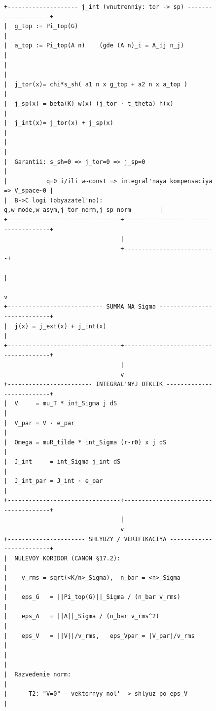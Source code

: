\begin{figure}[p]
{\begin{minipage}{0.97\textwidth}
\begin{Verbatim}[fontsize=\footnotesize]
+-------------------- j_int (vnutrenniy: tor -> sp) --------------------+
|  g_top := Pi_top(G)                                                   |
|  a_top := Pi_top(A n)    (gde (A n)_i = A_ij n_j)                     |
|                                                                        |
|  j_tor(x)= chi*s_sh( a1 n x g_top + a2 n x a_top )                     |
|  j_sp(x) = beta(K) w(x) (j_tor · t_theta) h(x)                         |
|  j_int(x)= j_tor(x) + j_sp(x)                                          |
|                                                                        |
|  Garantii: s_sh=0 => j_tor=0 => j_sp=0                                 |
|           q=0 i/ili w~const => integral'naya kompensaciya => V_space~0 |
|  B->C logi (obyazatel'no): q,w_mode,w_asym,j_tor_norm,j_sp_norm        |
+--------------------------------+--------------------------------------+
                                 |
                                 +--------------------------+
                                                            |
                                                            v
+--------------------------- SUMMA NA Sigma ----------------------------+
|  j(x) = j_ext(x) + j_int(x)                                           |
+--------------------------------+--------------------------------------+
                                 |
                                 v
+------------------------ INTEGRAL'NYJ OTKLIK --------------------------+
|  V     = mu_T * int_Sigma j dS                                        |
|  V_par = V · e_par                                                     |
|  Omega = muR_tilde * int_Sigma (r-r0) x j dS                           |
|  J_int     = int_Sigma j_int dS                                       |
|  J_int_par = J_int · e_par                                            |
+--------------------------------+--------------------------------------+
                                 |
                                 v
+---------------------- SHLYUZY / VERIFIKACIYA -------------------------+
|  NULEVOY KORIDOR (CANON §17.2):                                       |
|    v_rms = sqrt(<K/n>_Sigma),  n_bar = <n>_Sigma                      |
|    eps_G   = ||Pi_top(G)||_Sigma / (n_bar v_rms)                      |
|    eps_A   = ||A||_Sigma / (n_bar v_rms^2)                            |
|    eps_V   = ||V||/v_rms,   eps_Vpar = |V_par|/v_rms                  |
|                                                                        |
|  Razvedenie norm:                                                      |
|    - T2: "V=0" — vektornyy nol' -> shlyuz po eps_V                     |

\end{Verbatim}
\end{minipage}}
\end{figure}
